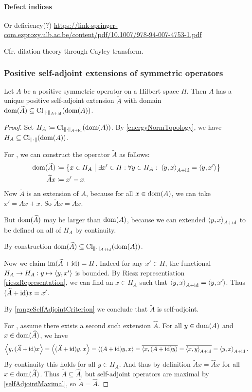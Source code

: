\paragraph{Defect indices}
Or deficiency(?)
\url{https://link-springer-com.ezproxy.ulb.ac.be/content/pdf/10.1007/978-94-007-4753-1.pdf}

Cfr. dilation theory through Cayley transform.

\subsubsection{Positive self-adjoint extensions of symmetric operators}
\begin{theorem}
Let $A$ be a positive symmetric operator on a Hilbert space $H$. Then $A$ has a unique positive self-adjoint extension $\widetilde{A}$ with domain $\operatorname{dom}(\widetilde{A}) \subseteq \operatorname{Cl}_{\lVert\cdot\rVert_{A+\operatorname{id}}}(\operatorname{dom}(A))$.
\end{theorem}
\begin{proof}
Set $H_A \coloneqq \operatorname{Cl}_{\lVert\cdot\rVert_{A+\operatorname{id}}}(\operatorname{dom}(A))$. By \ref{energyNormTopology}, we have $H_A \subseteq \operatorname{Cl}_{\lVert\cdot\rVert}(\operatorname{dom}(A))$.

For , we can construct the operator $\widetilde{A}$ as follows:
\begin{align*}
\operatorname{dom}(\widetilde{A}) &\coloneqq \left\{ x\in H_A \;\middle|\; \exists x'\in H:\forall y\in H_A:\; \left\langle y,x \right\rangle_{A+\operatorname{id}} = \left\langle y,x' \right\rangle \right\} \\
\widetilde{A}x &\coloneqq x' - x.
\end{align*}
Now $\widetilde{A}$ is an extension of $A$, because for all $x\in \operatorname{dom}(A)$, we can take $x' = Ax + x$. So $\widetilde{A}x = Ax$.

But $\operatorname{dom}(\widetilde{A})$ may be larger than $\operatorname{dom}(A)$, because we can extended $\left\langle y,x \right\rangle_{A+\operatorname{id}}$ to be defined on all of $H_A$ by continuity.

By construction $\operatorname{dom}(\widetilde{A}) \subseteq \operatorname{Cl}_{\lVert\cdot\rVert_{A+\operatorname{id}}}(\operatorname{dom}(A))$.

Now we claim $\operatorname{im}(\widetilde{A} + \operatorname{id}) = H$. Indeed for any $x'\in H$, the functional $H_A \to H_A: y\mapsto \left\langle y,x' \right\rangle$ is bounded. By Riesz representiation \ref{rieszRepresentation}, we can find an $x\in H_A$ such that $\left\langle y,x \right\rangle_{A+\operatorname{id}} = \left\langle y,x' \right\rangle$. Thus $(\widetilde{A} + \operatorname{id})x = x'$.

By \ref{rangeSelfAdjointCriterion} we conclude that $\widetilde{A}$ is self-adjoint. 

For , assume there exists a second such extension $\widehat{A}$. For all $y\in \operatorname{dom}(A)$ and $x\in \operatorname{dom}(\widehat{A})$, we have
\[ \left\langle y, (\widehat{A}+\operatorname{id})x \right\rangle = \left\langle (\widehat{A}+\operatorname{id})y, x \right\rangle = \left\langle (A+\operatorname{id})y, x \right\rangle = \overline{\left\langle x, (A+\operatorname{id})y \right\rangle} = \overline{\left\langle x, y \right\rangle_{A+\operatorname{id}}} = \left\langle y, x \right\rangle_{A+\operatorname{id}}. \]
By continuity this holds for all $y\in H_A$. And thus by definition $\widetilde{A}x = \widehat{A}x$ for all $x\in\operatorname{dom}(\widetilde{A})$. Thus $\widetilde{A} \subseteq \widehat{A}$, but self-adjoint operators are maximal by \ref{selfAdjointMaximal}, so $\widetilde{A} = \widehat{A}$.
\end{proof}

